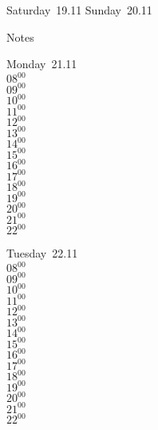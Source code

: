 \documentclass[11pt,a4paper]{book}\usepackage[]{graphicx}\usepackage[]{color}
\begin{document}
\begin{weekendbox}
  Saturday~19.11
  \tcblower
  Sunday~20.11
\end{weekendbox} %
\begin{notebox}
  Notes
\end{notebox}
\clearpage
\begin{headerbox}
\end{headerbox}
\begin{weekdaybox}
  Monday~21.11\\
  { 
  \vfill
  $08^{00}$\\
$09^{00}$\\
$10^{00}$\\
$11^{00}$\\
$12^{00}$\\
$13^{00}$\\
$14^{00}$\\
$15^{00}$\\
$16^{00}$\\
$17^{00}$\\
$18^{00}$\\
$19^{00}$\\
$20^{00}$\\
$21^{00}$\\
$22^{00}$\\
  }
\end{weekdaybox}
\begin{weekdaybox}
  Tuesday~22.11\\
  { 
  \vfill
  $08^{00}$\\
$09^{00}$\\
$10^{00}$\\
$11^{00}$\\
$12^{00}$\\
$13^{00}$\\
$14^{00}$\\
$15^{00}$\\
$16^{00}$\\
$17^{00}$\\
$18^{00}$\\
$19^{00}$\\
$20^{00}$\\
$21^{00}$\\
$22^{00}$\\
  }
\end{weekdaybox}
\end{document}
